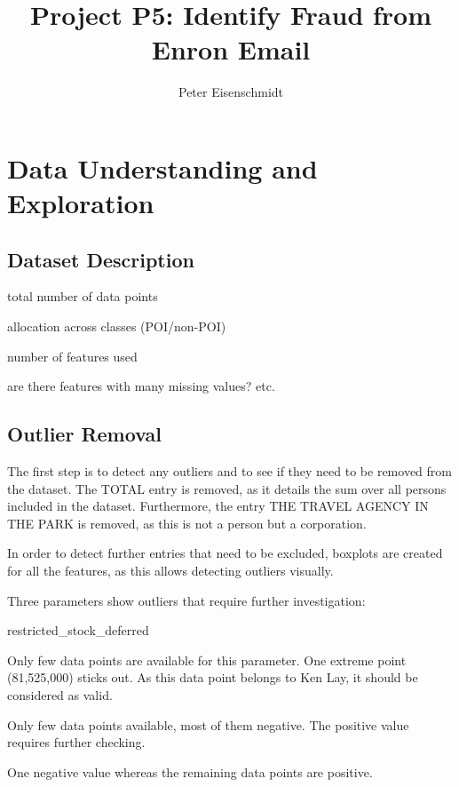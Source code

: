 \documentclass[11pt]{article} %
\title{Project P5: Identify Fraud from Enron Email}
\author{Peter Eisenschmidt}
\begin{document}
\maketitle

\section{Data Understanding and Exploration}

\subsection{Dataset Description}

total number of data points

allocation across classes (POI/non-POI)

number of features used

are there features with many missing values? etc.


\subsection{Outlier Removal}

The first step is to detect any outliers and to see if they need to be removed from the dataset. The TOTAL entry is removed, as it details the sum over all persons included in the dataset.  Furthermore, the entry THE TRAVEL AGENCY IN THE PARK is removed, as this is not a person but a corporation. \medskip

In order to detect further entries that need to be excluded, boxplots are created for all the features, as this allows detecting outliers visually.\medskip

Three parameters show outliers that require further investigation:


\begin{labeling}{restricted\_stock\_deferred}
\item [loan\_advances] Only few data points are available for this parameter. One extreme point (81,525,000) sticks out. As this data point belongs to Ken Lay, it should be considered as valid.
\item [restricted\_stock\_deferred] Only few data points available, most of them negative. The positive value requires further checking. 
\item [restricted\_stock] One negative value whereas the remaining data points are positive.
\end{labeling}
\end{document}
